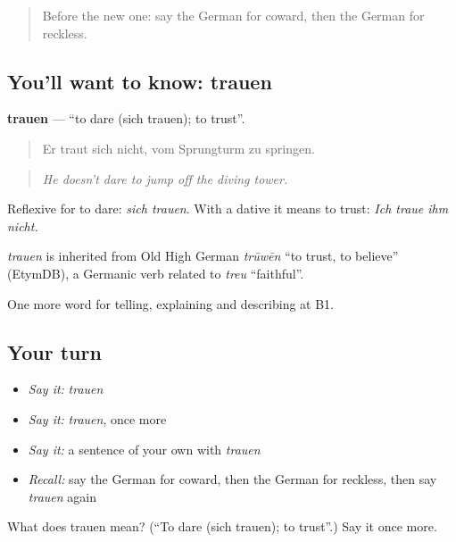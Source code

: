 \begin{quote}
Before the new one: say the German for coward, then the German for reckless.
\end{quote}

\subsection*{You'll want to know: trauen}
\textbf{trauen} — \textquotedblleft{}to dare (sich trauen); to trust\textquotedblright{}.

\begin{quote}
Er traut sich nicht, vom Sprungturm zu springen.
\end{quote}

\begin{quote}
\emph{He doesn't dare to jump off the diving tower.}
\end{quote}

Reflexive for to dare: \emph{sich trauen}. With a dative it means to trust: \emph{Ich traue ihm nicht.}

\begin{cousinweb}
\emph{trauen} is inherited from Old High German \emph{trūwēn} \textquotedblleft{}to trust, to believe\textquotedblright{} (EtymDB), a Germanic verb related to \emph{treu} \textquotedblleft{}faithful\textquotedblright{}.
\end{cousinweb}

\begin{grammarlens}[title={What you've built}]
One more word for telling, explaining and describing at B1.
\end{grammarlens}

\subsection*{Your turn}
\begin{itemize}
\raggedright
  \item \emph{Say it:} \emph{trauen}
  \item \emph{Say it:} \emph{trauen}, once more
  \item \emph{Say it:} a sentence of your own with \emph{trauen}
  \item \emph{Recall:} say the German for coward, then the German for reckless, then say \emph{trauen} again
\end{itemize}

\begin{tcolorbox}[breakable,colback=teal!4,colframe=teal!35!black,title={Before you move on}]
What does trauen mean? (\textquotedblleft{}To dare (sich trauen); to trust\textquotedblright{}.) Say it once more.
\end{tcolorbox}
